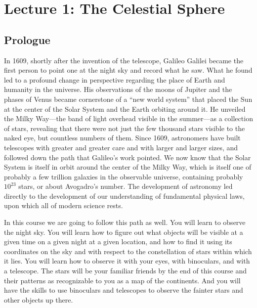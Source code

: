 \documentclass[12pt, preprint]{aastex}
\begin{document}
\newcommand{\degree}{\ensuremath{{}^\circ}}

\tableofcontents

\clearpage
\section{Lecture 1: The Celestial Sphere}

\subsection{Prologue}

In 1609, shortly after the invention of the telescope, Galileo Galilei
became the first person to point one at the night sky and record what
he saw. What he found led to a profound change in perspective
regarding the place of Earth and humanity in the universe. His
observations of the moons of Jupiter and the phases of Venus became
cornerstone of a ``new world system'' that placed the Sun at the
center of the Solar System and the Earth orbiting around it. He
unveiled the Milky Way---the band of light overhead visible in the
summer---as a collection of stars, revealing that there were not just
the few thousand stars visible to the naked eye, but countless numbers
of them. Since 1609, astronomers have built telescopes with greater
and greater care and with larger and larger sizes, and followed down
the path that Galileo's work pointed. We now know that the Solar
System is itself in orbit around the center of the Milky Way, which is
itself one of probably a few trillion galaxies in the observable
universe, containing probably $10^{23}$ stars, or about Avogadro's
number. The development of astronomy led directly to the development
of our understanding of fundamental physical laws, upon which all of
modern science rests.

In this course we are going to follow this path as well. You will
learn to observe the night sky. You will learn how to figure out what
objects will be visible at a given time on a given night at a given
location, and how to find it using its coordinates on the sky and with
respect to the constellation of stars within which it lies. You will
learn how to observe it with your eyes, with binoculars, and with a
telescope. The stars will be your familiar friends by the end of this
course and their patterns as recognizable to you as a map of the
continents. And you will have the skills to use binoculars and
telescopes to observe the fainter stars and other objects up there. 
\end{document}
